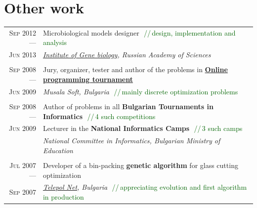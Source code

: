 \documentclass[a4paper,10pt]{article}
\def\myline{\color{linegray}\vline}
\newcommand{\minorcolor}[1]{\textcolor{mygray}{#1}}
\newcommand{\comment}[1]{\small\textcolor{darkgreen}{\,\,//\,#1}}
\newcommand{\mydate}[1]{\minorcolor{\textsc{#1}}}
\begin{document}
{%
\section{Other work}
\hspace{0mm}\begin{tabular}{r!{\myline}p{14cm}}
	\mydate{Sep 2012 ---}       &   Microbiological models designer
                                        \comment{design, implementation and analysis}\\
        \mydate{Jun 2013}           &   \textit{\href{http://www.genebiology.ru/}{Institute of Gene biology}, Russian Academy of Sciences}\\

	\\
	\mydate{Sep 2008 ---}       &   Jury, organizer, tester and author of the problems in \textbf{\href{http://konkurs.musala.com/}{Online programming tournament}}\\
        \mydate{Jun 2009}           &   \textit{Musala Soft, Bulgaria}
                                        \comment{mainly discrete optimization problems}\\

	\\
	\mydate{Sep 2008 ---}       &   Author of problems in all \textbf{Bulgarian Tournaments in Informatics}
                                        \comment{4 such competitions}\\
	\mydate{Jun 2009}           &   Lecturer in the \textbf{National Informatics Camps}
                                        \comment{3 such camps}\\
                                    &   \textit{National Committee in Informatics, Bulgarian Ministry of Education}\\

	\\
        \mydate{Jul 2007 ---}       &   Developer of a bin-packing \textbf{genetic algorithm} for glass cutting optimization\\
        \mydate{Sep 2007}           &   \textit{\href{http://telepol.net/telepol.net/}{Telepol Net}, Bulgaria}
                                        \comment{appreciating evolution and first algorithm in production}\\
	
\end{tabular}

}
\end{document}
